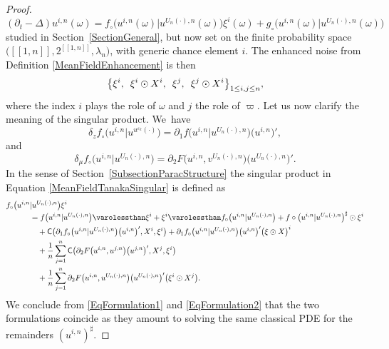 \documentclass[JEP,XML,SOM,Unicode,published]{cedram}
\theoremstyle{definition}
\let\epsilon\varepsilon
\begin{document}
\begin{proof}
\begin{equation}\label{MeanFieldTanakaSingular}
(\partial_t-\Delta)u^{i,n}(\omega) = f_\circ\bigl(u^{i,n}(\omega) \big\vert u^{U_n(\cdot),n}(\omega) \bigr)\xi^i(\omega) + g_\circ\bigl(u^{i,n}(\omega) \big\vert u^{U_n(\cdot),n}(\omega) \bigr)
\end{equation}
studied in Section~\ref{SectionGeneral}, but now set on the finite probability space $\bigl([\![ 1,n]\!],2^{[\![ 1,n]\!]},\lambda_n\bigr)$, with generic chance element $i$. The enhanced noise from Definition \ref{MeanFieldEnhancement} is then
\[
\bigl\{ \xi^i,\enskip \xi^i\odot X^i,\enskip \xi^j, \enskip \xi^j \odot X^i \bigr\}_{1\leq i,j\leq n},
\]
where the index $i$ plays the role of $\omega$ and $j$ the role of $\varpi$. Let us now clarify the meaning of the singular product. We~have
\[
\delta_z f_\circ\bigl(u^{i,n} \vert u^{u^{\epsilon_k}(\cdot)}\bigr) = \partial_1 f\bigl(u^{i,n} \vert u^{U_n(\cdot),n} \bigr)\bigl(u^{i,n}\bigr)',
\]
and
\[
\delta_\mu f_\circ\bigl(u^{i,n} \vert u^{U_n(\cdot),n}\bigr) = \partial_2 F\bigl(u^{i,n}, v^{U_n(\cdot),n}\bigr)\bigl(u^{U_n(\cdot),n}\bigr)'.
\]
In the sense of Section~\ref{SubsectionParacStructure} the singular product in Equation \eqref{MeanFieldTanakaSingular} is defined as
\begin{align} \label{EqFormulation2}
f_\circ\bigl(u^{i,n} &\vert u^{U_n(\cdot),n} \bigr)\xi^i \notag\\[-3pt]
&= f\bigl(u^{i,n} \vert u^{U_n(\cdot),n} \bigr) \varolessthan \xi^i + \xi^i \varolessthan f_\circ\bigl(u^{i,n} \vert u^{U_n(\cdot),n} \bigr) + f\circ\bigl(u^{i,n} \vert u^{U_n(\cdot),n} \bigr)^\sharp\odot\xi^i \notag\\
&\quad+{\sf{C}}\bigl( \partial_1 f_\circ\bigl(u^{i,n} \vert u^{U_n(\cdot),n} \bigr)\bigl(u^{i,n}\bigr)',X^i,\xi^i \bigr) + \partial_1 f_\circ\bigl(u^{i,n} \vert u^{U_n(\cdot),n} \bigr)\bigl(u^{i,n}\bigr)'\bigl(\xi\odot X\bigr)^i \\
&\quad+\frac{1}{n}\sum_{j=1}^n \mathsf{C}\bigl( \partial_2 F\bigl(u^{i,n},u^{j,n}\bigr)\bigl(u^{j,n}\bigr)', X^j,\xi^i \bigr)\notag \\
&\quad+\frac{1}{n}\sum_{j=1}^n \partial_2 F\bigl(u^{i,n},u^{U_n(\cdot),n}\bigr)\bigl(u^{U_n(\cdot),n}\bigr)'\bigl(\xi^i\odot X^j\bigr).\notag
\end{align}
We conclude from \eqref{EqFormulation1} and \eqref{EqFormulation2} that the two formulations coincide as they amount to solving the same classical PDE for the remainders $(u^{i,n})^\sharp$.
\end{proof}
\end{document}

